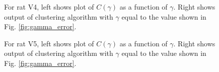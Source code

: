 \documentclass[superscriptaddress, twocolumn, prl]{revtex4}
\begin{document}
\begin{figure}
\centering
{}
\caption{For rat V4, left shows plot of $C\left(\gamma \right)$ as a function of $\gamma$. Right shows output of clustering algorithm with $\gamma$ equal to the value shown in Fig. \ref{fig:gamma_error}.}
\end{figure}

\begin{figure}
\centering
{}
\caption{For rat V5, left shows plot of $C\left(\gamma \right)$ as a function of $\gamma$. Right shows output of clustering algorithm with $\gamma$ equal to the value shown in Fig. \ref{fig:gamma_error}.}
\end{figure}
\end{document}
